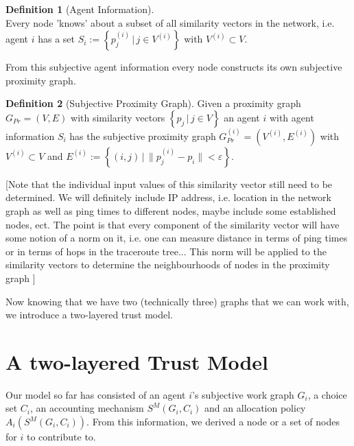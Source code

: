 \documentclass[11pt,a4paper]{article}
\theoremstyle{definition}
\newtheorem{definition}{Definition}[section]
\theoremstyle{theorem}
\theoremstyle{proposition}
\theoremstyle{corollary}
\theoremstyle{lemma}
\theoremstyle{example}
\theoremstyle{remark}
\begin{document}
\begin{definition}[Agent Information]\ \\
Every node 'knows' about a subset of all similarity vectors in the network, i.e. agent $i$ has a set $S_i:=\left\lbrace{}p^{(i)}_j\,|\,j\in{}V^{(i)}\right\rbrace$ with $V^{(i)}\subset{}V$.
\end{definition}
\noindent{}From this subjective agent information every node constructs its own subjective proximity graph.
\begin{definition}[Subjective Proximity Graph]
Given a proximity graph $G_{Pr}=(V,E)$ with similarity vectors $\left\lbrace{}p_j\,|\,j\in{}V\right\rbrace$ an agent $i$ with agent information $S_i$ has the subjective proximity graph $G_{Pr}^{(i)}=(V^{(i)},E^{(i)})$ with $V^{(i)}\subset{}V$ and $E^{(i)}:=\left\lbrace{}(i,j)\,|\,\|p^{(i)}_j-p_i\|<\varepsilon\right\rbrace$.
\end{definition}


\noindent{} \begin{center} [Note that the individual input values of this similarity vector still need to be determined. We will definitely include IP address, i.e. location in the network graph as well as ping times to different nodes, maybe include some established nodes, ect. The point is that every component of the similarity vector will have some notion of a norm on it, i.e. one can measure distance in terms of ping times or in terms of hops in the traceroute tree... This norm will be applied to the similarity vectors to determine the neighbourhoods of nodes in the proximity graph ] \vspace{1em}\\ \end{center}

\noindent{}Now knowing that we have two (technically three) graphs that we can work with, we introduce a two-layered trust model.\vspace{1em}\\

\section{A two-layered Trust Model}
\label{sec:A two-layered Trust Model}
Our model so far has consisted of an agent $i$'s subjective work graph $G_i$, a choice set $C_i$, an accounting mechanism $S^M(G_i,C_i)$ and an allocation policy $A_i(S^M(G_i,C_i))$. From this information, we derived a node or a set of nodes for $i$ to contribute to. 
\end{document}
